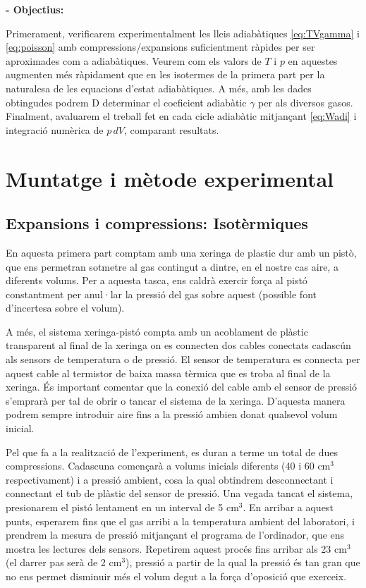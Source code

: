 \documentclass[a4paper,twoside,12pt]{article}
\theoremstyle{definition}
\begin{document}
	\textbf{- Objectius:}
	
	Primerament, verificarem experimentalment les lleis adiabàtiques \ref{eq:TVgamma} i  \ref{eq:poisson} amb compressions/expansions suficientment ràpides per ser aproximades com a adiabàtiques. Veurem com els valors de  $T$ i $p$ en aquestes augmenten més ràpidament que en les isotermes de la primera part per la naturalesa de les equacions d'estat adiabàtiques. A més, amb les dades obtingudes podrem D
	determinar el coeficient adiabàtic $\gamma$ per als diversos gasos. Finalment, avaluarem el treball fet en cada cicle adiabàtic mitjançant \eqref{eq:Wadi} i integració numèrica de $p\,dV$, comparant resultats.
	\newpage
	
	\section{Muntatge i mètode experimental}
	
	\subsection{Expansions i compressions: Isotèrmiques}
	En aquesta primera part comptam amb una xeringa de plastic dur amb un pistò, que ens permetran sotmetre al gas contingut a dintre, en el nostre cas aire, a diferents volums. Per a aquesta tasca, ens caldrà exercir força al pistó constantment per anul·lar la pressió del gas sobre aquest (possible font d'incertesa sobre el volum).
	
	A més, el sistema xeringa-pistó compta amb un acoblament de plàstic transparent al final de la xeringa on es connecten dos cables conectats cadascún als sensors de temperatura o de pressió. El sensor de temperatura es connecta per aquest cable al termistor de baixa massa tèrmica que es troba al final de la xeringa. És important comentar que la conexió del cable amb el sensor de pressió s'emprarà per tal de obrir o tancar el sistema de la xeringa. D'aquesta manera podrem sempre introduir aire fins a la pressió ambien donat qualsevol volum inicial.
	
	Pel que fa a la realització de l'experiment, es duran a terme un total de dues compressions. Cadascuna començarà a volums inicials diferents (40 i 60 cm$^3$ respectivament) i a pressió ambient, cosa la qual obtindrem desconnectant i connectant el tub de plàstic del sensor de pressió. Una vegada tancat el sistema, presionarem el pistó lentament en un interval de 5 cm$^3$. En arribar a aquest punts, esperarem fins que el gas arribi a la temperatura ambient del laboratori, i prendrem la mesura de pressió mitjançant el programa de l'ordinador, que ens mostra les lectures dels sensors. Repetirem aquest procés fins arribar als 23 cm$^3$ (el darrer pas serà de 2 cm$^3$), pressió a partir de la qual la pressió és tan gran que no ens permet disminuir més el volum degut a la força d'oposició que exerceix.
	
\end{document}
